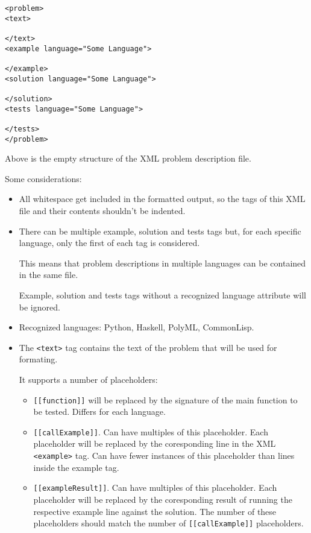 \documentclass[a4paper,12pt]{article}
\begin{document}
\lstset{language=XML}
\begin{lstlisting}
<problem>
<text>

</text>
<example language="Some Language">

</example>
<solution language="Some Language">

</solution>
<tests language="Some Language">

</tests>
</problem>
\end{lstlisting}

Above is the empty structure of the XML problem description file.

Some considerations:
\begin{itemize}
 \item All whitespace get included in the formatted output, so the tags of this XML file and their contents shouldn't be indented.
 \item There can be multiple example, solution and tests tags but, for each specific language, only the first of each tag is considered. 
 
 This means that problem descriptions in multiple languages can be contained in the same file.
 
 Example, solution and tests tags without a recognized language attribute will be ignored.
 
 \item Recognized languages: Python, Haskell, PolyML, CommonLisp.
 
 \item The \texttt{<text>} tag contains the text of the problem that will be used for formating. 
 
 It supports a number of placeholders:
 
 \begin{itemize}
 
  \item \texttt{[[function]]} will be replaced by the signature of the main function to be tested. Differs for each language.
  
  \item \texttt{[[callExample]]}. Can have multiples of this placeholder. Each placeholder will be replaced by the coresponding line in the XML \texttt{<example>} tag. Can have fewer instances of this placeholder than lines inside the example tag.
  
  \item \texttt{[[exampleResult]]}. Can have multiples of this placeholder. Each placeholder will be replaced by the coresponding result of running the respective example line against the solution. The number of these placeholders should match the number of \texttt{[[callExample]]} placeholders.
  

\end{itemize}
\end{itemize}
\end{document}
